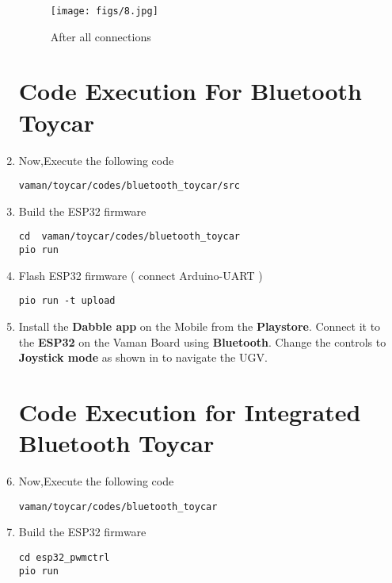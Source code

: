 \begin{enumerate}[label=\thesection.\arabic*.,ref=\thesection.\theenumi]
\begin{figure}[H]
\centering
\texttt{[image: figs/8.jpg]}
\caption{After all connections}
\end{figure}

\section{Code Execution For Bluetooth Toycar}
\raggedright

\item Now,Execute the following code
\begin{lstlisting}
vaman/toycar/codes/bluetooth_toycar/src
\end{lstlisting}

\item Build the ESP32 firmware
\begin{lstlisting}
cd  vaman/toycar/codes/bluetooth_toycar
pio run
\end{lstlisting} 

\item Flash ESP32 firmware ( connect Arduino-UART  )
\begin{lstlisting}
pio run -t upload
\end{lstlisting} 
\item Install the \textbf{Dabble app} on the Mobile from the \textbf{Playstore}. Connect it to the \textbf{ESP32} on the Vaman Board using \textbf{Bluetooth}. Change the controls to \textbf{Joystick mode} as shown in to navigate the UGV.\\

\section{Code Execution for Integrated Bluetooth Toycar}
\raggedright
\item Now,Execute the following code 

\begin{lstlisting}
vaman/toycar/codes/bluetooth_toycar
\end{lstlisting}

\item Build the ESP32 firmware
\begin{lstlisting}
cd esp32_pwmctrl
pio run
\end{lstlisting} 


\end{enumerate}
